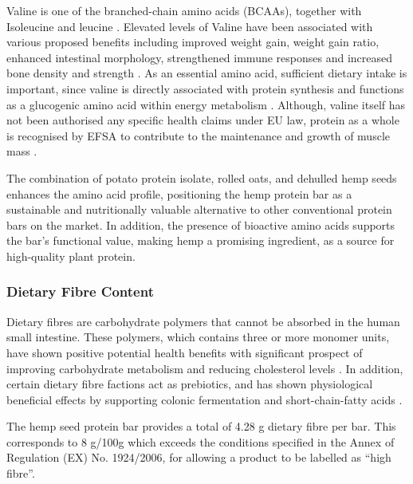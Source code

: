 \vspace{1em}
Valine is one of the branched-chain amino acids (BCAAs), together with Isoleucine and leucine \cite*{art_18_valine}. Elevated levels of Valine have been associated with various proposed benefits including improved weight gain, weight gain ratio, enhanced intestinal morphology, strengthened immune responses and increased bone density and strength \cite*{art_19_valine_broiler}. As an essential amino acid, sufficient dietary intake is important, since valine is directly associated with protein synthesis and functions as a glucogenic amino acid within energy metabolism \cite*{art_19_valine_broiler}. Although, valine itself has not been authorised any specific health claims under EU law, protein as a whole is recognised by EFSA to contribute to the maintenance and growth of muscle mass \cite*{art_20_regulation4322012}.

\vspace{1em}
The combination of potato protein isolate, rolled oats, and dehulled hemp seeds enhances the amino acid profile, positioning the hemp protein bar as a sustainable and nutritionally valuable alternative to other conventional protein bars on the market. In addition, the presence of bioactive amino acids supports the bar’s functional value, making hemp a promising ingredient, as a source for high-quality plant protein.
    
\subsubsection{Dietary Fibre Content} 
Dietary fibres are carbohydrate polymers that cannot be absorbed in the human small intestine. These polymers, which contains three or more monomer units, have shown positive potential health benefits with significant prospect of improving carbohydrate metabolism and reducing cholesterol levels \cite*{art_12_df_oats_01,art_13_df_oats_02}. In addition, certain dietary fibre factions act as prebiotics, and has shown physiological beneficial effects by supporting colonic fermentation and short-chain-fatty acids \cite*{art_13_df_oats_02,art_14_df_hemp}. 

\vspace{1em}
The hemp seed protein bar provides a total of 4.28 g dietary fibre per bar. This corresponds to 8 g/100g which exceeds the conditions specified in the Annex of Regulation (EX) No. 1924/2006, for allowing a product to be labelled as “high fibre”.

